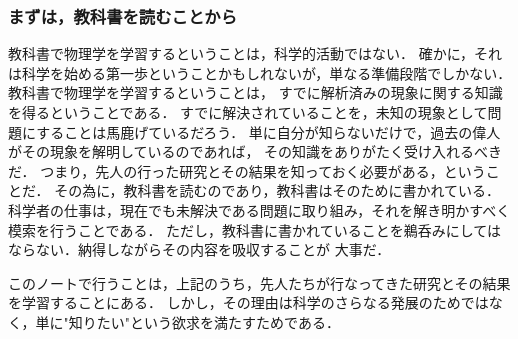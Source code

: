         \subsubsection{まずは，教科書を読むことから}
            教科書で物理学を学習するということは，科学的活動ではない．
            確かに，それは科学を始める第一歩ということかもしれないが，単なる準備段階でしかない．
            教科書で物理学を学習するということは，
            すでに解析済みの現象に関する知識を得るということである．
            すでに解決されていることを，未知の現象として問題にすることは馬鹿げているだろう．
            単に自分が知らないだけで，過去の偉人がその現象を解明しているのであれば，
            その知識をありがたく受け入れるべきだ．
            つまり，先人の行った研究とその結果を知っておく必要がある，ということだ．
            その為に，教科書を読むのであり，教科書はそのために書かれている．
            科学者の仕事は，現在でも未解決である問題に取り組み，それを解き明かすべく模索を行うことである．
            ただし，教科書に書かれていることを鵜呑みにしてはならない．納得しながらその内容を吸収することが
            大事だ．

            このノートで行うことは，上記のうち，先人たちが行なってきた研究とその結果を学習することにある．
            しかし，その理由は科学のさらなる発展のためではなく，単に"知りたい"という欲求を満たすためである．

